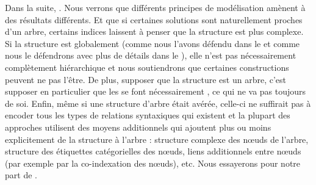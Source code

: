 Dans la suite, . Nous verrons que différents principes de modélisation amènent à des résultats différents. Et que si certaines solutions sont naturellement proches d’un arbre, certains indices laissent à penser que la structure est plus complexe. Si la structure est globalement  (comme nous l’avons défendu dans le  et comme nous le défendrons avec plus de détails dans le ), elle n’est pas nécessairement complètement hiérarchique et nous soutiendrons que certaines constructions peuvent ne pas l’être. De plus, supposer que la structure est un arbre, c’est supposer en particulier que les  se font nécessairement , ce qui ne va pas toujours de soi. Enfin, même si une structure d’arbre était avérée, celle-ci ne suffirait pas à encoder tous les types de relations syntaxiques qui existent et la plupart des approches utilisent des moyens additionnels qui ajoutent plus ou moins explicitement de la structure à l’arbre : structure complexe des nœuds de l’arbre, structure des étiquettes catégorielles des nœuds, liens additionnels entre nœuds (par exemple par la co-indexation des nœuds), etc. Nous essayerons pour notre part de .

